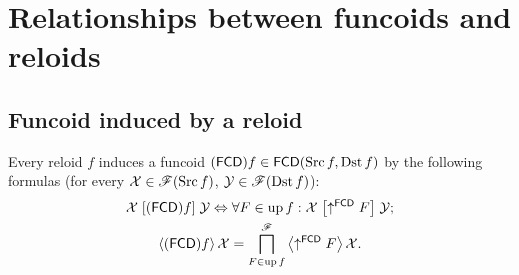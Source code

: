 
\chapter{Relationships between funcoids and reloids}


\section{Funcoid induced by a reloid}

Every reloid $f$ induces a funcoid
$(\mathsf{FCD}) f\in\mathsf{FCD}(\operatorname{Src} f,\operatorname{Dst} f)$ by the following formulas
(for every $\mathcal{X}\in\mathscr{F}(\operatorname{Src} f)$, $\mathcal{Y}\in\mathscr{F}(\operatorname{Dst} f)$):
\begin{gather*}
\mathcal{X}\mathrel{\left[(\mathsf{FCD}) f\right]}\mathcal{Y}\Leftrightarrow\forall F\in\operatorname{up} f:\mathcal{X}\mathrel{\left[\uparrow^{\mathsf{FCD}}F\right]}\mathcal{Y};\\
\left\langle (\mathsf{FCD}) f\right\rangle\mathcal{X}=\bigsqcap_{F\in\operatorname{up} f}^{\mathscr{F}}\left\langle \uparrow^{\mathsf{FCD}}F\right\rangle\mathcal{X}.
\end{gather*}



